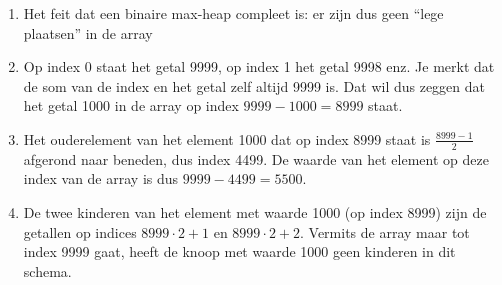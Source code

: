 \begin{oef}
\begin{opl}
\begin{enumerate}
\item Het feit dat een binaire max-heap compleet is: er zijn dus geen “lege plaatsen” in de array

\item Op index 0 staat het getal 9999, op index 1 het getal 9998 enz. Je merkt dat de som van de index en het getal zelf altijd 9999 is. Dat wil dus zeggen dat het getal 1000 in de array op index $9999-1000=8999$ staat.

\item Het ouderelement van het element 1000 dat op index 8999 staat is $\frac{8999-1}{2}$ afgerond naar beneden, dus index 4499. De waarde van het element op deze index van de array is dus $9999-4499=5500$.

\item De twee kinderen van het element met waarde 1000 (op index 8999) zijn de getallen op indices $8999\cdot 2 + 1$ en $8999\cdot 2 + 2$. Vermits de array maar tot index 9999 gaat, heeft de knoop met waarde 1000 geen kinderen in dit schema.
\end{enumerate}
\end{opl}
\end{oef}





